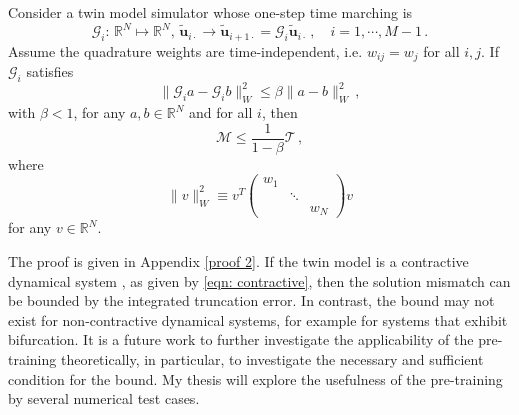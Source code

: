 \begin{theorem}
    Consider a twin model simulator whose one-step time marching is
    \begin{equation}
        \mathcal{G}_i:\, \mathbb{R}^N\mapsto\mathbb{R}^N,\, \tilde{\boldsymbol{u}}_{i\cdot}\rightarrow 
        \tilde{\boldsymbol{u}}_{i+1\cdot}=\mathcal{G}_i
        \tilde{\boldsymbol{u}}_{i\cdot} \,,\quad i=1,\cdots, M-1\,.
    \end{equation}
    Assume the quadrature weights are time-independent, i.e.
    $w_{ij} = w_{j}$ for all $i,j$.
    If $\mathcal{G}_i$ satisfies
    \begin{equation}
        \|\mathcal{G}_ia-\mathcal{G}_ib\|^2_{W} \le \beta \|a-b\|^2_{W} \,,
        \label{eqn: contractive}
    \end{equation}
    with $\beta<1$,
    for any $a, b \in \mathbb{R}^N$ and for all $i$,
    then 
    \begin{equation}
        \mathcal{M} \le \frac{1}{1-\beta} \mathcal{T}\,,
    \end{equation}
    where
    \begin{equation}
        \|v\|^2_{W} \equiv v^T 
            \begin{pmatrix}
                {w_{1}} && \\
                & \ddots & \\
                && {w_{N}}
            \end{pmatrix} v
    \end{equation}
    for any $v\in \mathbb{R}^N$.
    \label{theorem: 2}
\end{theorem}
The proof is given in Appendix \ref{proof 2}. If the twin model is a contractive dynamical 
system \cite{contractive system}, as given by \eqref{eqn: contractive}, then the
solution mismatch can be bounded by the integrated truncation error. In contrast, 
the bound may not exist for non-contractive dynamical systems, for example for systems 
that exhibit bifurcation. It is a future work to further investigate the applicability of the pre-training
theoretically, in particular, to investigate the necessary and sufficient condition for the bound. 
My thesis will explore the usefulness of the pre-training by several numerical test cases.\\

